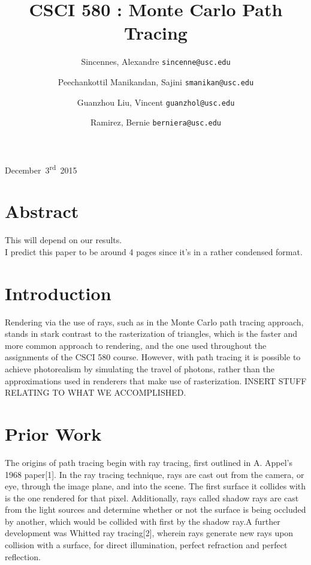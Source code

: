 \documentclass[journal]{IEEEtran}
\begin{document}
\title{CSCI 580 : Monte Carlo Path Tracing}
{December~3\textsuperscript{rd}~2015}
\author{
	Sincennes, Alexandre
	\texttt{sincenne@usc.edu}\\
	\and
 	Peechankottil Manikandan, Sajini
 	\texttt{smanikan@usc.edu}\\
  	\and
	Guanzhou Liu, Vincent
 	\texttt{guanzhol@usc.edu}\\
  	\and
	Ramirez, Bernie
 	\texttt{berniera@usc.edu}\\
  
}
\maketitle


\section{Abstract}
This will depend on our results.\\
I predict this paper to be around 4 pages since it's in a rather condensed format.


\section{Introduction}
Rendering via the use of rays, such as in the Monte Carlo path tracing approach, stands in stark contrast to the rasterization of triangles, which is the faster and more common approach to rendering, and the one used throughout the assignments of the CSCI 580 course. However, with path tracing it is possible to achieve photorealism by simulating the travel of photons, rather than the approximations used in renderers that make use of rasterization. INSERT STUFF RELATING TO WHAT WE ACCOMPLISHED.


\section{Prior Work}
The origins of path tracing begin with ray tracing, first outlined in A. Appel's 1968 paper[1]. In the ray tracing technique, rays are cast out from the camera, or eye, through the image plane, and into the scene. The first surface it collides with is the one rendered for that pixel. Additionally, rays called shadow rays are cast from the light sources and determine whether or not the surface is being occluded by another, which would be collided with first by the shadow ray.A further development was Whitted ray tracing[2], wherein rays generate new rays upon collision with a surface, for direct illumination, perfect refraction and perfect reflection.
\end{document}

